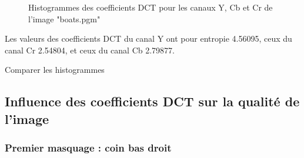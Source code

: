 \documentclass[12pt]{report}
\begin{document}
\begin{figure}[H]
\begin{center}
\caption{Histogrammes des coefficients DCT pour les canaux Y, Cb et Cr de l'image "boats.pgm"}
\end{center}
\end{figure}

Les valeurs des coefficients DCT du canal Y ont pour entropie 4.56095, ceux du canal Cr 2.54804, et ceux du canal Cb 2.79877.

Comparer les histogrammes 

\subsection{Influence des coefficients DCT sur la qualité de l'image}

\subsubsection{Premier masquage : coin bas droit}
\end{document}
